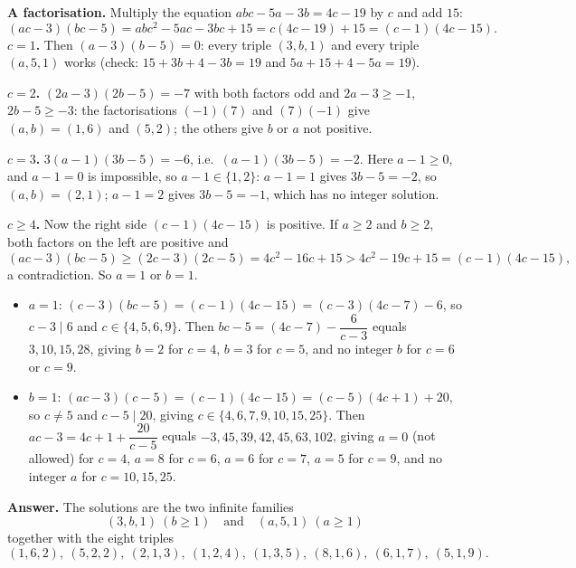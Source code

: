 \textbf{A factorisation.} Multiply the equation $abc-5a-3b=4c-19$ by $c$ and add $15$:
\[
(ac-3)(bc-5)=abc^2-5ac-3bc+15=c(4c-19)+15=(c-1)(4c-15).
\]
\textbf{$c=1$.} Then $(a-3)(b-5)=0$: every triple $(3,b,1)$ and every triple $(a,5,1)$ works (check: $15+3b+4-3b=19$ and $5a+15+4-5a=19$).

\textbf{$c=2$.} $(2a-3)(2b-5)=-7$ with both factors odd and $2a-3\ge-1$, $2b-5\ge-3$: the factorisations $(-1)(7)$ and $(7)(-1)$ give $(a,b)=(1,6)$ and $(5,2)$; the others give $b$ or $a$ not positive.

\textbf{$c=3$.} $3(a-1)(3b-5)=-6$, i.e.\ $(a-1)(3b-5)=-2$. Here $a-1\ge0$, and $a-1=0$ is impossible, so $a-1\in\{1,2\}$: $a-1=1$ gives $3b-5=-2$, so $(a,b)=(2,1)$; $a-1=2$ gives $3b-5=-1$, which has no integer solution.

\textbf{$c\ge4$.} Now the right side $(c-1)(4c-15)$ is positive. If $a\ge2$ and $b\ge2$, both factors on the left are positive and
\[
(ac-3)(bc-5)\ge(2c-3)(2c-5)=4c^2-16c+15>4c^2-19c+15=(c-1)(4c-15),
\]
a contradiction. So $a=1$ or $b=1$.
\begin{itemize}
\item $a=1$: $(c-3)(bc-5)=(c-1)(4c-15)=(c-3)(4c-7)-6$, so $c-3\mid6$ and $c\in\{4,5,6,9\}$. Then $bc-5=(4c-7)-\dfrac{6}{c-3}$ equals $3,10,15,28$, giving $b=2$ for $c=4$, $b=3$ for $c=5$, and no integer $b$ for $c=6$ or $c=9$.
\item $b=1$: $(ac-3)(c-5)=(c-1)(4c-15)=(c-5)(4c+1)+20$, so $c\ne5$ and $c-5\mid20$, giving $c\in\{4,6,7,9,10,15,25\}$. Then $ac-3=4c+1+\dfrac{20}{c-5}$ equals $-3,45,39,42,45,63,102$, giving $a=0$ (not allowed) for $c=4$, $a=8$ for $c=6$, $a=6$ for $c=7$, $a=5$ for $c=9$, and no integer $a$ for $c=10,15,25$.
\end{itemize}
\textbf{Answer.} The solutions are the two infinite families
\[
\boxed{(3,b,1)\ (b\ge1)\quad\text{and}\quad(a,5,1)\ (a\ge1)}
\]
together with the eight triples
\[
\boxed{(1,6,2),\ (5,2,2),\ (2,1,3),\ (1,2,4),\ (1,3,5),\ (8,1,6),\ (6,1,7),\ (5,1,9)}.
\]
